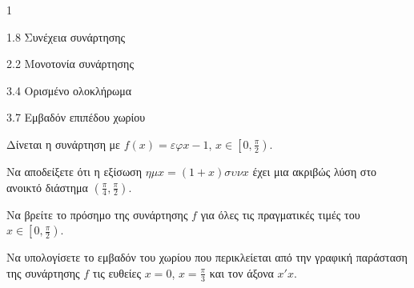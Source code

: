 \begin{ylh}{1}
    \item 1.8 Συνέχεια συνάρτησης
    \item 2.2 Μονοτονία συνάρτησης
    \item 3.4 Ορισμένο ολοκλήρωμα
    \item 3.7 Εμβαδόν επιπέδου χωρίου
\end{ylh}

Δίνεται η συνάρτηση με $f(x) = \varepsilon\varphi x - 1$, $x \in \left[0, \frac{\pi}{2}\right)$.

\begin{alist}
\item Να αποδείξετε ότι η εξίσωση $\eta\mu x = (1+x)\sigma\upsilon\nu x$ έχει μια ακριβώς λύση στο ανοικτό διάστημα $\left(\frac{\pi}{4}, \frac{\pi}{2}\right)$. 
\item Να βρείτε το πρόσημο της συνάρτησης $f$ για όλες τις πραγματικές τιμές του $x \in \left[0, \frac{\pi}{2}\right)$. 
\item Να υπολογίσετε το εμβαδόν του χωρίου που περικλείεται από την γραφική παράσταση της συνάρτησης $f$ τις ευθείες $x=0$, $x=\frac{\pi}{3}$ και τον άξονα $x'x$. 
\end{alist}